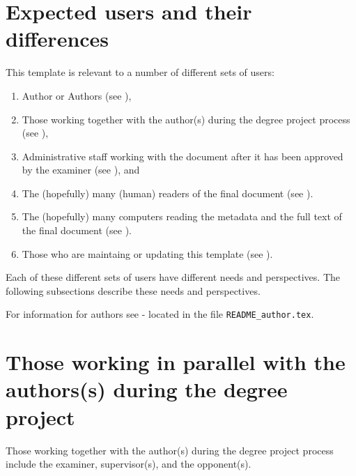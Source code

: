 \section{Expected users and their differences}
\label{sec:expectedUsers}
This template is relevant to a number of different sets of users:
\begin{enumerate}[leftmargin=*,label=\textbf{Users \arabic*}, ref={Users \arabic*}]
    \item \label{users:authors} Author or Authors (see ),
    \item \label{users:others} Those working together with the author(s) during the degree project process (see ),
    \item \label{users:admins} Administrative staff working with the document after it has been approved by the examiner (see ), and
    \item \label{users:readers} The (hopefully) many (human) readers of the final document (see ).
    \item \label{users:searchEngines} The (hopefully) many computers reading the metadata and the full text of the final document (see ).
    \item \label{users:maintainer} Those who are maintaing or updating this template (see ).
\end{enumerate}

Each of these different sets of users have different needs and perspectives. The following subsections describe these needs and perspectives.

For information for authors see  - located in the file \texttt{README\_author.tex}.

\section{Those working in parallel with the authors(s) during the degree project}
\label{sec:examinerAdvisorsOpponent}
Those working together with the author(s) during the degree project process include the examiner, supervisor(s), and the opponent(s).

